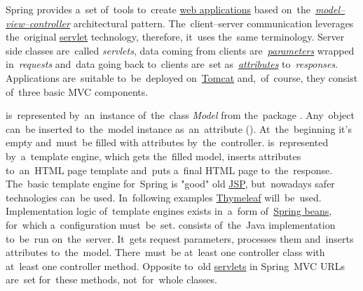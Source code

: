
Spring provides a~set of~tools to~create \hyperref[webserviceapplication]{web applications} based on~the~\hyperref[mvc]{\textit{model--view--controller}} architectural pattern.
The~client--server communication leverages the~original \hyperref[servlet]{servlet} technology, therefore, it~uses the~same terminology.
Server side classes are~called \textit{servlets}, data coming from clients are~\hyperref[jspattributeparameter]{\textit{parameters}} wrapped in~\textit{requests} and~data going back to~clients are~set as~\hyperref[jspattributeparameter]{\textit{attributes}} to~\textit{responses}.
Applications are~suitable to~be~deployed on~\hyperref[tomcat]{Tomcat} and,~of~course, they consist of~three basic MVC components.

\begin{itemize}
     is~represented by~an~instance of~the~class \textit{Model} from the~package . Any~object can~be inserted to~the~model instance as~an~attribute ().
            At~the~beginning it's empty and~must~be filled with attributes by~the~controller.
     is~represented by~a~template engine, which gets the~filled model, inserts attributes to~an~HTML page template and~puts a~final HTML page to~the~response.
            The~basic template engine for~Spring is "good" old \hyperref[jsp]{JSP}, but~nowadays safer technologies can~be used.
            In~following examples \href{https://www.thymeleaf.org/}{Thymeleaf} will~be~used.
            Implementation logic of~template engines exists in~a~form of~\hyperref[springinversionofcontrol]{Spring beans}, for~which a~configuration must~be~set.
     consists of~the~Java implementation to~be~run on~the~server.
            It~gets request parameters, processes them and~inserts attributes to~the~model.
            There~must~be at~least one controller class with at~least one controller method.
            Opposite to~old \hyperref[servlet]{servlets} in Spring~MVC URLs are~set for~these methods, not~for~whole classes.
\end{itemize}
\newpage

\newpage
